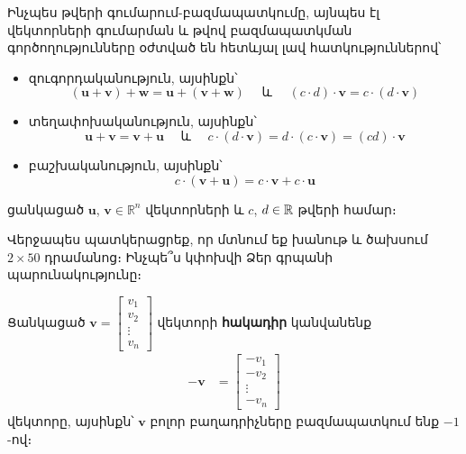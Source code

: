 Ինչպես թվերի գումարում-բազմապատկումը, այնպես էլ վեկտորների գումարման և թվով բազմապատկման գործողությունները օժտված են հետևյալ լավ հատկություններով՝
\begin{itemize}
    \item զուգորդականություն, այսինքն՝
    \[
      (\mathbf{u} + \mathbf{v}) + \mathbf{w} = \mathbf{u} + (\mathbf{v} + \mathbf{w}) \quad  \text{ և } \quad
     (c \cdot d) \cdot \mathbf{v} = c \cdot (d \cdot \mathbf{v})
    \]

    \item տեղափոխականություն, այսինքն՝
        \[
     \mathbf{u} + \mathbf{v} = \mathbf{v} + \mathbf{u} \quad  \text{ և } \quad
     c \cdot (d \cdot \mathbf{v}) =  d \cdot (c \cdot \mathbf{v}) = (cd) \cdot \mathbf{v}
    \]

    \item բաշխականություն, այսինքն՝
    \[
     c \cdot (\mathbf{v} + \mathbf{u}) = c \cdot \mathbf{v} + c \cdot \mathbf{u}
    \]
\end{itemize}
ցանկացած  $\mathbf{u}$, $\mathbf{v} \in  \mathbb{R}^n$ վեկտորների և $c$, $d\in \mathbb{R}$ թվերի համար։

Վերջապես պատկերացրեք, որ մտնում եք խանութ և ծախսում ${2 \times 50}$ դրամանոց։ Ինչպե՞ս կփոխվի Ձեր գրպանի պարունակությունը։

\begin{definition}
Ցանկացած \( \mathbf{v} = \begin{bmatrix} v_1 \\ v_2 \\ \vdots \\ v_n \end{bmatrix} \) վեկտորի \textbf{հակադիր} կանվանենք
  \begin{align*}
     -\mathbf{v} &= \begin{bmatrix} -v_1 \\ -v_2 \\ \vdots \\ -v_n \end{bmatrix}
  \end{align*}
վեկտորը, այսինքն՝ $\mathbf{v}$ բոլոր բաղադրիչները բազմապատկում ենք $-1$-ով։
\end{definition}

